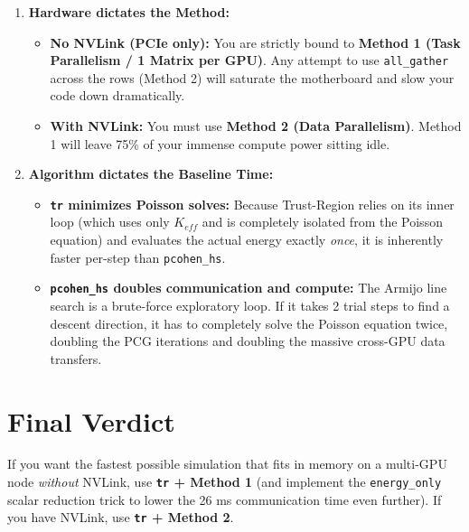 \documentclass[12pt,a4paper]{article}
\begin{document}
\begin{enumerate}
    \item \textbf{Hardware dictates the Method:}
    \begin{itemize}
        \item \textbf{No NVLink (PCIe only):} You are strictly bound to \textbf{Method 1 (Task Parallelism / 1 Matrix per GPU)}. Any attempt to use \texttt{all\_gather} across the rows (Method 2) will saturate the motherboard and slow your code down dramatically.
        \item \textbf{With NVLink:} You must use \textbf{Method 2 (Data Parallelism)}. Method 1 will leave 75\% of your immense compute power sitting idle.
    \end{itemize}

    \item \textbf{Algorithm dictates the Baseline Time:}
    \begin{itemize}
        \item \textbf{\texttt{tr} minimizes Poisson solves:} Because Trust-Region relies on its inner loop (which uses only $K_{eff}$ and is completely isolated from the Poisson equation) and evaluates the actual energy exactly \textit{once}, it is inherently faster per-step than \texttt{pcohen\_hs}.
        \item \textbf{\texttt{pcohen\_hs} doubles communication and compute:} The Armijo line search is a brute-force exploratory loop. If it takes 2 trial steps to find a descent direction, it has to completely solve the Poisson equation twice, doubling the PCG iterations and doubling the massive cross-GPU data transfers.
    \end{itemize}
\end{enumerate}

\section{Final Verdict}
If you want the fastest possible simulation that fits in memory on a multi-GPU node \textit{without} NVLink, use \textbf{\texttt{tr} + Method 1} (and implement the \texttt{energy\_only} scalar reduction trick to lower the 26 ms communication time even further). If you have NVLink, use \textbf{\texttt{tr} + Method 2}.
\end{document}

